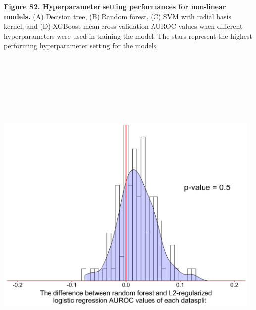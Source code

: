 \documentclass[11pt,]{article}
\begin{document}
\textbf{Figure S2. Hyperparameter setting performances for non-linear
models.} (A) Decision tree, (B) Random forest, (C) SVM with radial basis
kernel, and (D) XGBoost mean cross-validation AUROC values when
different hyperparameters were used in training the model. The stars
represent the highest performing hyperparameter setting for the models.
\newpage
\includegraphics[height=17.5cm, width=13cm]{Figure_S3.png}
\end{document}

